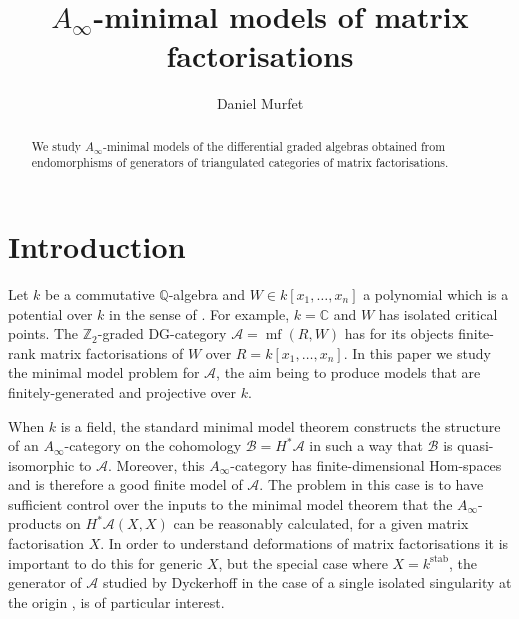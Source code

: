 \documentclass[english,letter paper,12pt,leqno]{article}
\theoremstyle{example}
\numberwithin{equation}{section}
\def\res{\operatorname{Res}}
\def\stab{\operatorname{stab}}
\def\nZ{\mathds{Z}}
\begin{document}
\def\Res{\res\!}
\newcommand{\ud}{\mathrm{d}}
\newcommand{\Ress}[1]{\res_{#1}\!}
\newcommand{\cat}[1]{\mathcal{#1}}
\newcommand{\lto}{\longrightarrow}
\newcommand{\xlto}[1]{\stackrel{#1}\lto}
\newcommand{\mf}[1]{\mathfrak{#1}}
\newcommand{\md}[1]{\mathscr{#1}}
\def\sus{\l}
\def\l{\,|\,}
\def\sgn{\textup{sgn}}
\def\samp{\zeta}
\def\Samp{Z}
\def\traff{N}

\title{$A_\infty$-minimal models of matrix factorisations}
\author{Daniel Murfet}

\maketitle

\begin{abstract}
We study $A_\infty$-minimal models of the differential graded algebras obtained from endomorphisms of generators of triangulated categories of matrix factorisations.
\end{abstract}

\section{Introduction}

Let $k$ be a commutative $\mathbb{Q}$-algebra and $W \in k[x_1,\ldots,x_n]$ a polynomial which is a potential over $k$ in the sense of \cite[\S 2.2]{lgdual}. For example, $k = \mathbb{C}$ and $W$ has isolated critical points. The $\nZ_2$-graded DG-category $\cat{A} = \operatorname{mf}(R, W)$ has for its objects finite-rank matrix factorisations of $W$ over $R = k[x_1,\ldots,x_n]$. In this paper we study the minimal model problem for $\cat{A}$, the aim being to produce models that are finitely-generated and projective over $k$.

When $k$ is a field, the standard minimal model theorem \cite{??} constructs the structure of an $A_\infty$-category on the cohomology $\cat{B} = H^* \cat{A}$ in such a way that $\cat{B}$ is quasi-isomorphic to $\cat{A}$. Moreover, this $A_\infty$-category has finite-dimensional Hom-spaces and is therefore a good finite model of $\cat{A}$. The problem in this case is to have sufficient control over the inputs to the minimal model theorem that the $A_\infty$-products on $H^* \cat{A}(X,X)$ can be reasonably calculated, for a given matrix factorisation $X$. In order to understand deformations of matrix factorisations \cite{??,??,??} it is important to do this for generic $X$, but the special case where $X = k^{\stab}$, the generator of $\cat{A}$ studied by Dyckerhoff in the case of a single isolated singularity at the origin \cite{d0904.4713}, is of particular interest.
\end{document}
